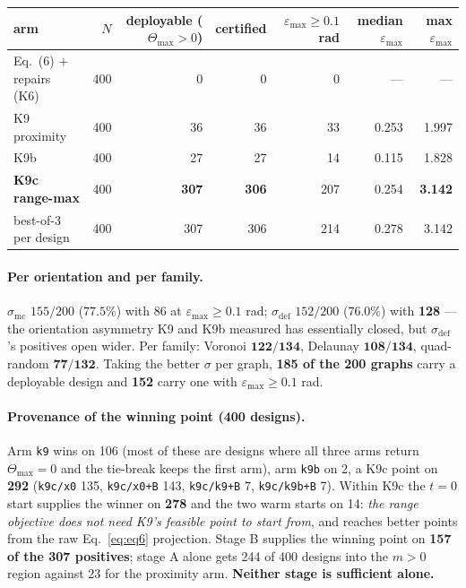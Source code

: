 \documentclass[11pt,a4paper]{article}
\theoremstyle{definition}
\newcommand{\Tmax}{\Theta_{\max}}
\begin{document}
\begin{center}
\small
\begin{tabular}{@{}lrrrrrr@{}}
\toprule
arm & $N$ & deployable ($\Tmax>0$) & certified & $\varepsilon_{\max}\ge0.1$ rad & median $\varepsilon_{\max}$ & max $\varepsilon_{\max}$ \\
\midrule
Eq.~(6) $+$ repairs (K6) & 400 & 0 & 0 & 0 & --- & --- \\
K9 proximity & 400 & 36 & 36 & 33 & 0.253 & 1.997 \\
K9b & 400 & 27 & 27 & 14 & 0.115 & 1.828 \\
\textbf{K9c range-max} & 400 & \textbf{307} & \textbf{306} & 207 & 0.254 & \textbf{3.142} \\
best-of-3 per design & 400 & 307 & 306 & 214 & 0.278 & 3.142 \\
\bottomrule
\end{tabular}
\end{center}

\paragraph{Per orientation and per family.} $\sigma_{\mathrm{mc}}$ $155/200$ ($77.5\%$) with
86 at $\varepsilon_{\max}\ge0.1$ rad; $\sigma_{\mathrm{def}}$ $152/200$ ($76.0\%$) with
\textbf{128} --- the orientation asymmetry K9 and K9b measured has essentially closed, but
$\sigma_{\mathrm{def}}$'s positives open wider. Per family: Voronoi $\mathbf{122/134}$,
Delaunay $\mathbf{108/134}$, quad-random $\mathbf{77/132}$. Taking the better $\sigma$ per
graph, \textbf{185 of the 200 graphs} carry a deployable design and \textbf{152} carry one
with $\varepsilon_{\max}\ge0.1$ rad.

\paragraph{Provenance of the winning point (400 designs).} Arm \texttt{k9} wins on 106
(most of these are designs where all three arms return $\Tmax=0$ and the tie-break keeps the
first arm), arm \texttt{k9b} on 2, a K9c point on \textbf{292}
(\texttt{k9c/x0} 135, \texttt{k9c/x0+B} 143, \texttt{k9c/k9+B} 7, \texttt{k9c/k9b+B} 7).
Within K9c the $t=0$ start supplies the winner on \textbf{278} and the two warm starts on 14:
\emph{the range objective does not need K9's feasible point to start from}, and reaches better
points from the raw Eq.~\eqref{eq:eq6} projection. Stage B supplies the winning point on
\textbf{157 of the 307 positives}; stage A alone gets 244 of 400 designs into the $m>0$ region
against 23 for the proximity arm. \textbf{Neither stage is sufficient alone.}
\end{document}

